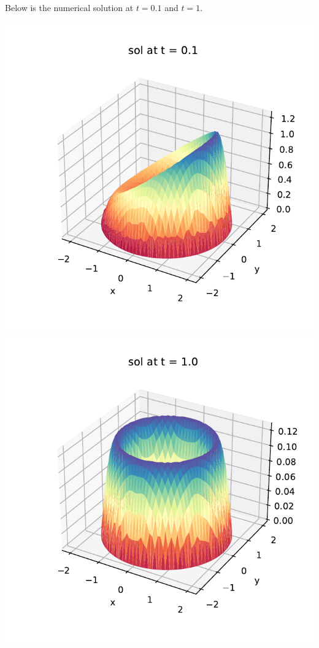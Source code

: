 \documentclass{article}
\begin{document}
\begin{enumerate}[label=(\alph*)]
Below is the numerical solution at $t=0.1$ and $t=1$.

\begin{center}
	\includegraphics[scale=.6]{hw10 sol t=0.1}
	\includegraphics[scale=.6]{hw10 sol t=1.0}
\end{center}


\end{enumerate}
\end{document}
